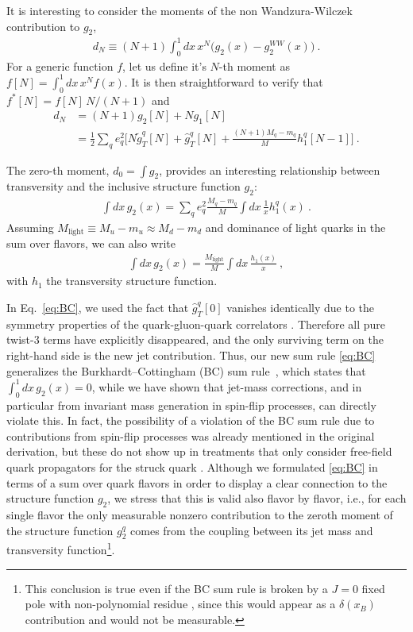 \documentclass[preprintnumbers,floatfix,nofootinbib]{revtex4}
\newcommand{\xbj}{{x_B}}                   %
\newcommand{\mj}{M_q}
\newcommand{\mq}{m_q}
\begin{document}
It is interesting to consider the moments of the non Wandzura-Wilczek contribution to $g_2$,
\begin{align}
  d_N \equiv (N+1) \int_0^1 dx\,x^N \bigg( g_2(x) - g_2^{WW}(x) \bigg) \ .
\end{align}
For a generic function $f$, let us define it's $N$-th moment as $f[N]=\int_0^1 dx\, x^{N} f(x)$. It is then straightforward to verify that $f^*[N] = f[N]\,N/(N+1)$ and  
\begin{align}
  d_N & = (N+1) g_2[N] + N g_1[N] \\
  & = \frac12 \sum_q e_q^2 \bigg[ N \tilde g_T^q[N] + \hat g_T^q[N]  
    + \frac{(N+1) \mj- \mq}{M} h_1^q[N-1] \bigg] \ .
\end{align}

The zero-th moment, $d_0=\int g_2$, provides an interesting relationship between transversity and the inclusive structure function $g_2$:
\begin{align}
  \label{eq:BC}
  \int dx\, g_2(x) = \sum_q e_q^2 \frac{\mj-\mq}{M} \int dx\, \frac{1}{x} h_1^q(x) \ .
\end{align}
Assuming $M_\text{light}\equiv M_u -m_u \approx M_d -m_d$ and dominance of light quarks in the sum over flavors, we can also write
\begin{align}
  \label{eq:BC-sfn}
  \int dx\, g_2(x) = \frac{M_\text{light}}{M} \int dx\, \frac{h_1(x)}{x} \ ,
\end{align}
with $h_1$ the transversity structure function.

In Eq.~\eqref{eq:BC}, we used the fact that $\widehat g_T^q[0]$ vanishes identically due to the symmetry properties of the quark-gluon-quark correlators \cite{Accardi:2009au}.
Therefore all pure twist-3 terms have explicitly disappeared, and the only surviving term on the right-hand side is the new jet contribution.
Thus, our new sum rule \eqref{eq:BC}
generalizes the Burkhardt--Cottingham (BC) sum rule~\cite{Burkhardt:1970ti},
which states that  $\int_0^1 dx\, g_2(x) =0$, while we have shown that jet-mass corrections, and in particular from invariant mass generation in spin-flip processes, can directly violate this.
In fact, the possibility of a violation of the BC sum rule due to 
contributions from spin-flip processes was already mentioned in the original
derivation, but these do not show up in treatments that only
consider free-field quark propagators for the struck quark
\cite{Jaffe:1996zw}.  Although we formulated \eqref{eq:BC} in terms of a sum over quark flavors in order to display a clear
connection to the structure function $g_2$, we stress that this is valid also
flavor by flavor, i.e., for each single flavor the only measurable nonzero contribution to the zeroth moment of the
structure function $g_2^q$ comes from the coupling between its jet mass and transversity function\footnote{This conclusion is true even if the BC sum rule is broken by a $J = 0$ fixed pole with
non-polynomial residue \cite{Jaffe:1996zw}, since this would appear as a
$\delta(\xbj)$ contribution and would not be measurable.}.
\end{document}
